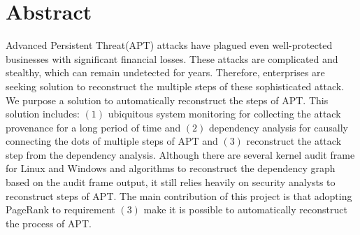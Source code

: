 \section{Abstract}
Advanced Persistent Threat(APT) attacks have plagued even well-protected businesses with significant financial losses. These attacks are complicated and stealthy, which can remain undetected for years. Therefore, enterprises are seeking solution to reconstruct the multiple steps of these sophisticated attack. We purpose a solution to automatically reconstruct the steps of APT. This solution includes: $\left(1\right)$ ubiquitous system monitoring for collecting the attack provenance for a long period of time and $\left(2\right)$ dependency analysis for causally connecting the dots of multiple steps of APT and $\left(3\right)$ reconstruct the attack step from the dependency analysis. Although there are several kernel audit frame for Linux and Windows and algorithms to reconstruct the dependency graph based on the audit frame output, it still relies heavily on security analysts to reconstruct steps of APT. The main contribution of this project is that adopting PageRank to requirement $\left(3\right)$ make it is possible to automatically reconstruct the process of APT.

